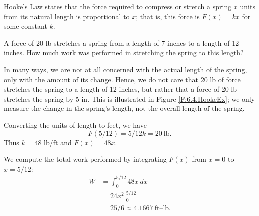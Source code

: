 
\begin{example} \label{eg:6.5.4} %
Hooke's Law states that the force required to compress or stretch a spring $x$ units from its natural length is proportional to $x$; that is, this force is $F(x) = kx$ for some constant $k$.

A force of 20 lb stretches a spring from a length of 7 inches to a length of 12 inches. How much work was performed in stretching the spring to this length?

\solution
In many ways, we are not at all concerned with the actual length of the spring, only with the amount of its change. Hence, we do not care that 20 lb of force stretches the spring to a length of 12 inches, but rather that a force of 20 lb stretches the spring by 5 in. This is illustrated in Figure \ref{F:6.4.HookeEx}; we only measure the change in the spring's length, not the overall length of the spring.

Converting the units of length to feet, we have $$F(5/12) = 5/12k = 20\ \text{lb}.$$ Thus $k = 48$ lb/ft and $F(x) = 48x$. 

We compute the total work performed by integrating $F(x)$ from $x=0$ to $x=5/12$:
\begin{align*}
W 	&= 	\int_0^{5/12} 48x \ dx \\
&=	24x^2\Big|_0^{5/12} \\
&=  25/6 \approx 4.1667\ \text{ft--lb.}
\end{align*}

\end{example}